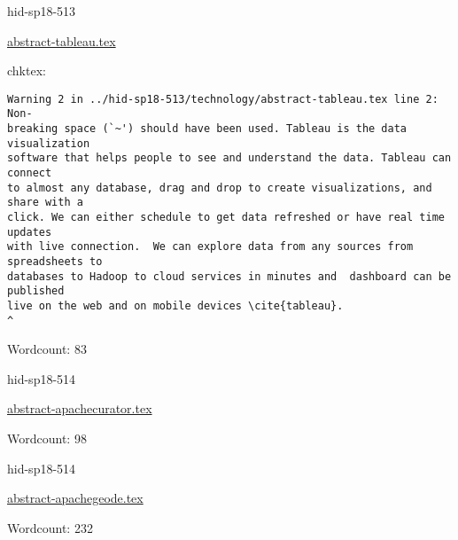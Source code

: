 \begin{IU}

hid-sp18-513

\href{https://github.com/cloudmesh-community/hid-sp18-513/blob/master//technology/abstract-tableau.tex}{abstract-tableau.tex}

 
chktex:
\begin{tiny}
\begin{verbatim}
Warning 2 in ../hid-sp18-513/technology/abstract-tableau.tex line 2: Non-
breaking space (`~') should have been used. Tableau is the data visualization
software that helps people to see and understand the data. Tableau can connect
to almost any database, drag and drop to create visualizations, and share with a
click. We can either schedule to get data refreshed or have real time updates
with live connection.  We can explore data from any sources from spreadsheets to
databases to Hadoop to cloud services in minutes and  dashboard can be published
live on the web and on mobile devices \cite{tableau}.
^
\end{verbatim}
\end{tiny}

Wordcount: 83

\end{IU}



\begin{IU}

hid-sp18-514

\href{https://github.com/cloudmesh-community/hid-sp18-514/blob/master//technology/abstract-apachecurator.tex}{abstract-apachecurator.tex}

 

Wordcount: 98

\end{IU}



\begin{IU}

hid-sp18-514

\href{https://github.com/cloudmesh-community/hid-sp18-514/blob/master//technology/abstract-apachegeode.tex}{abstract-apachegeode.tex}

 

Wordcount: 232

\end{IU}



